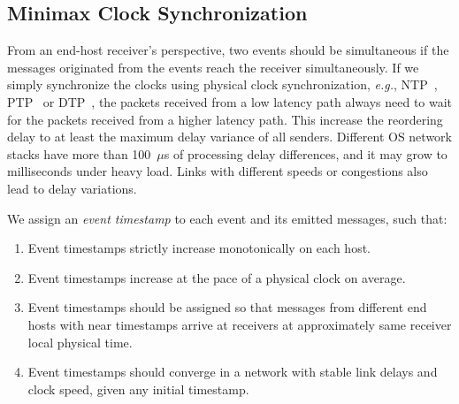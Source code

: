 
\subsection{Minimax Clock Synchronization}
\label{sec:sync}

From an end-host receiver's perspective, two events should be simultaneous if the messages originated from the events reach the receiver simultaneously.
If we simply synchronize the clocks using physical clock synchronization, \textit{e.g.}, NTP~\cite{mills1991internet}, PTP~\cite{correll2005design} or DTP~\cite{lee2016globally}, the packets received from a low latency path always need to wait for the packets received from a higher latency path. This increase the reordering delay to at least the maximum delay variance of all senders.
Different OS network stacks have more than 100~$\mu$s of processing delay differences, and it may grow to milliseconds under heavy load.
Links with different speeds or congestions also lead to delay variations.

We assign an \textit{event timestamp} to each event and its emitted messages, such that:
\begin{enumerate}
\item Event timestamps strictly increase monotonically on each host.
\item Event timestamps increase at the pace of a physical clock on average.
\item Event timestamps should be assigned so that messages from different end hosts with near timestamps arrive at receivers at approximately same receiver local physical time.
\item Event timestamps should converge in a network with stable link delays and clock speed, given any initial timestamp.
\end{enumerate}

